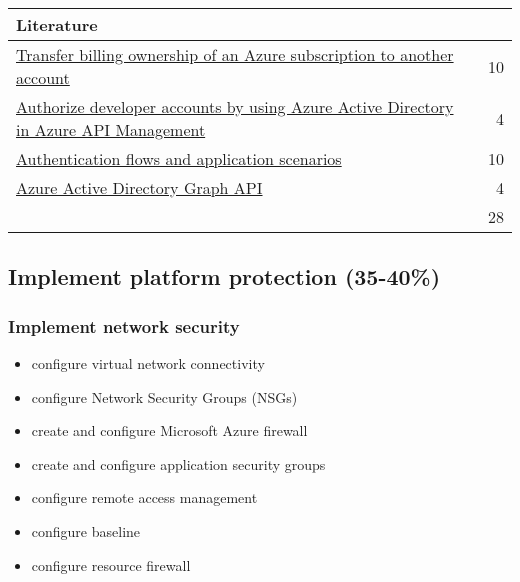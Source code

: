\begin{tabular}{p{14cm} | r}
\textbf{Literature} & \\
\hline
\href{https://docs.microsoft.com/en-us/azure/billing/billing-subscription-transfer}{Transfer billing ownership of an Azure subscription to another account} & 10 \\
\href{https://docs.microsoft.com/en-us/azure/api-management/api-management-howto-aad}{Authorize developer accounts by using Azure Active Directory in Azure API Management} & 4 \\
\href{https://docs.microsoft.com/en-us/azure/active-directory/develop/authentication-flows-app-scenarios}{Authentication flows and application scenarios} & 10 \\
\href{https://docs.microsoft.com/en-us/azure/active-directory/develop/active-directory-graph-api}{Azure Active Directory Graph API} & 4 \\
\cline{2-2} 
 & 28 \\
\end{tabular}

\clearpage
\subsection{Implement platform protection (35-40\%)}

\subsubsection{Implement network security}
\begin{itemize}
\item configure virtual network connectivity 
\item configure Network Security Groups (NSGs) 
\item create and configure Microsoft Azure firewall 
\item create and configure application security groups 
\item configure remote access management 
\item configure baseline 
\item configure resource firewall 
\end{itemize}

